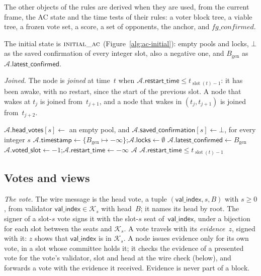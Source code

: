 \documentclass{article}
\newcommand{\genesis}{B_{\mathrm{gen}}}
\newcommand{\slot}{\operatorname{slot}}
\newcommand{\valindex}{\mathsf{val\_index}}
\newcommand{\committee}{\mathcal K}
\newcommand{\AC}{\mathcal A}
\newcommand{\headVotes}{\mathsf{head\_votes}}
\newcommand{\latestConfirmed}{\mathsf{latest\_confirmed}}
\newcommand{\timestamp}{\mathsf{timestamp}}
\newcommand{\savedConfirmation}{\mathsf{saved\_confirmation}}
\newcommand{\locks}{\mathsf{locks}}
\newcommand{\restartTime}{\mathsf{restart\_time}}
\newcommand{\votedSlot}{\mathsf{voted\_slot}}
\begin{document}
The other objects of the rules are derived when they are used, from the
current frame, the AC state and the time tests of their rules: a voter
block tree, a viable tree, a frozen vote set, a score, a set of
opponents, the anchor, and $\mathit{fg\_confirmed}$.

The initial state is $\Call{initial\_ac}{}$ (Figure~\ref{alg:ac-initial}):
empty pools and locks, $\bot$ as the saved confirmation of every integer
slot, also a negative one, and
$\genesis$ as $\AC.\latestConfirmed$.

\emph{Joined.}  The node is \emph{joined} at time~$t$ when
$\AC.\restartTime\leq t_{\slot(t)-1}$: it has been awake, with no restart,
since the start of the previous slot.  A node that wakes at $t_j$ is joined
from~$t_{j+1}$, and a node that wakes in $(t_j,t_{j+1})$ is joined
from~$t_{j+2}$.

\label{alg:ac-initial}
\nopagebreak
{\footnotesize
\begin{algorithmic}[1]
  \State $\AC.\headVotes[s]\gets$ an empty pool, and $\AC.\savedConfirmation[s]\gets\bot$, for every integer $s$
  \State $\AC.\timestamp\gets\{\genesis\mapsto-\infty\}$;\quad $\AC.\locks\gets\emptyset$
  \State $\AC.\latestConfirmed\gets\genesis$
  \State $\AC.\votedSlot\gets-1$;\quad $\AC.\restartTime\gets-\infty$
  \State \Return $\AC$
\EndFunction
\vspace{1pt}
\Function{joined}{$\AC,t$}
  \State \Return $\AC.\restartTime\leq t_{\slot(t)-1}$
\EndFunction
\end{algorithmic}
}

\subsection{Votes and views}\label{sec:ac-views}

\emph{The vote.}  The wire message is the head vote, a tuple
$(\valindex,s,B)$ with $s\geq0$, from validator $\valindex\in\committee_s$
with head~$B$; it names its head by root.  The signer of a slot-$s$ vote
signs it with the slot-$s$ seat of~$\valindex$, under a bijection for each
slot between the seats and $\committee_s$.  A vote travels with its
\emph{evidence}~$z$, signed with it: $z$ shows that $\valindex$ is in
$\committee_s$.  A node issues evidence only for its own vote, in a slot
whose committee holds it; it checks the evidence of a presented vote for the
vote's validator, slot and head at the wire check (below), and forwards a
vote with the evidence it received.
Evidence is never part of a block.
\end{document}

